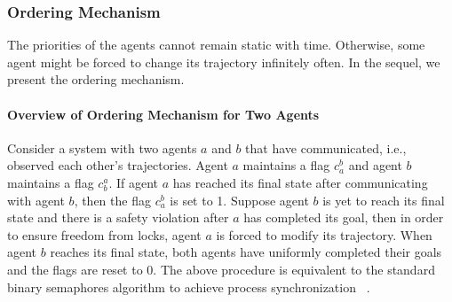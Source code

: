 \subsubsection*{Ordering Mechanism}
The priorities of the agents cannot remain static with time. Otherwise, some agent might be forced to change its trajectory infinitely often. 
In the sequel, we present the ordering mechanism. 

\paragraph*{Overview of Ordering Mechanism for Two Agents}

\noindent Consider a system with two agents $a$ and $b$ that have communicated, i.e., observed each other's trajectories. Agent $a$ maintains a flag $c_a^b$ and agent $b$ maintains a flag $c^a_b$. If agent $a$ has reached its final state after communicating with agent $b$, then the flag $c^b_a$ is set to 1. 
Suppose agent $b$ is yet to reach its final state and there is a safety violation after $a$ has completed its goal, then in order to ensure freedom from locks, agent $a$ is forced to modify its trajectory. When agent $b$ reaches its final state, both agents have uniformly completed their goals and the flags are reset to $0$. The above procedure is equivalent to the standard binary semaphores algorithm to achieve process synchronization ~\cite{silberschatz2018operating}. 

